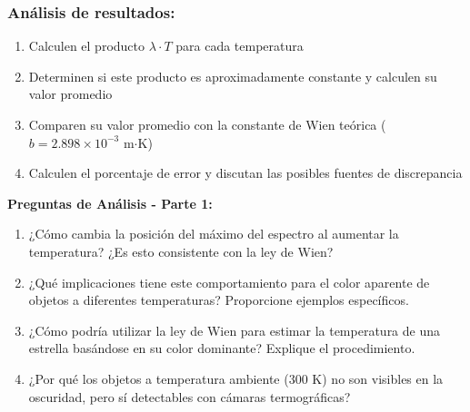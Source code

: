 \documentclass[12pt,a4paper]{article}
\begin{document}
	\subsubsection{Análisis de resultados:}
	\begin{enumerate}
		\item Calculen el producto $\lambda \cdot T$ para cada temperatura
		\item Determinen si este producto es aproximadamente constante y calculen su valor promedio
		\item Comparen su valor promedio con la constante de Wien teórica ($b = 2.898 \times 10^{-3}$ m$\cdot$K)
		\item Calculen el porcentaje de error y discutan las posibles fuentes de discrepancia
	\end{enumerate}
	
	\begin{preguntabox}
		\textbf{Preguntas de Análisis - Parte 1:}
		\begin{enumerate}
			\item ¿Cómo cambia la posición del máximo del espectro al aumentar la temperatura? ¿Es esto consistente con la ley de Wien?
			
			\vspace{1.5cm}
			
			\item ¿Qué implicaciones tiene este comportamiento para el color aparente de objetos a diferentes temperaturas? Proporcione ejemplos específicos.
			
			\vspace{1.5cm}
			
			\item ¿Cómo podría utilizar la ley de Wien para estimar la temperatura de una estrella basándose en su color dominante? Explique el procedimiento.
			
			\vspace{1.5cm}
			
			\item ¿Por qué los objetos a temperatura ambiente (300 K) no son visibles en la oscuridad, pero sí detectables con cámaras termográficas?
			
			\vspace{1.5cm}
		\end{enumerate}
	\end{preguntabox}
	
	
\end{document}
